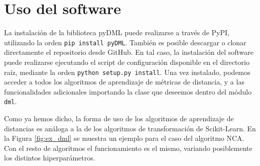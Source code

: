 \section{Uso del software}

La instalación de la biblioteca pyDML puede realizarse a través de PyPI, utilizando la orden \texttt{pip install pyDML}. También es posible descargar o clonar directamente el repositorio desde GitHub. En tal caso, la instalación del software puede realizarse ejecutando el script de configuración disponible en el directorio raíz, mediante la orden \texttt{python setup.py install}. Una vez instalado, podemos acceder a todos los algoritmos de aprendizaje de métricas de distancia, y a las funcionalidades adicionales importando la clase que deseemos dentro del módulo \texttt{dml}.

Como ya hemos dicho, la forma de uso de los algoritmos de aprendizaje de distancias es análoga a la de los algoritmos de transformación de Scikit-Learn. En la Figura \ref{fig:ex_dml} se muestra un ejemplo para el caso del algoritmo NCA. Con el resto de algoritmos el funcionamiento es el mismo, variando posiblemente los distintos hiperparámetros.

